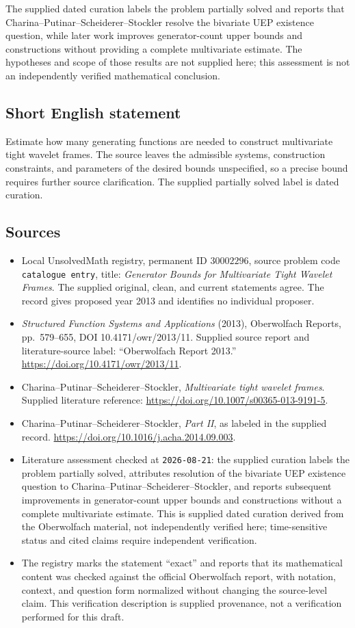 \documentclass[11pt]{article}
\begin{document}
The supplied dated curation labels the problem partially solved and reports that Charina--Putinar--Scheiderer--Stockler resolve the bivariate UEP existence question, while later work improves generator-count upper bounds and constructions without providing a complete multivariate estimate. The hypotheses and scope of those results are not supplied here; this assessment is not an independently verified mathematical conclusion.
\subsection{Short English statement}
Estimate how many generating functions are needed to construct multivariate tight wavelet frames. The source leaves the admissible systems, construction constraints, and parameters of the desired bounds unspecified, so a precise bound requires further source clarification. The supplied partially solved label is dated curation.
\subsection{Sources}
\begin{itemize}
\item Local UnsolvedMath registry, permanent ID \(30002296\), source problem code \texttt{catalogue entry}, title: \emph{Generator Bounds for Multivariate Tight Wavelet Frames}. The supplied original, clean, and current statements agree. The record gives proposed year 2013 and identifies no individual proposer.
\item \emph{Structured Function Systems and Applications} (2013), Oberwolfach Reports, pp.\ 579--655, DOI 10.4171/owr/2013/11. Supplied source report and literature-source label: ``Oberwolfach Report 2013.'' \url{https://doi.org/10.4171/owr/2013/11}.
\item Charina--Putinar--Scheiderer--Stockler, \emph{Multivariate tight wavelet frames}. Supplied literature reference: \url{https://doi.org/10.1007/s00365-013-9191-5}.
\item Charina--Putinar--Scheiderer--Stockler, \emph{Part II}, as labeled in the supplied record. \url{https://doi.org/10.1016/j.acha.2014.09.003}.
\item Literature assessment checked at \texttt{2026-08-21}: the supplied curation labels the problem partially solved, attributes resolution of the bivariate UEP existence question to Charina--Putinar--Scheiderer--Stockler, and reports subsequent improvements in generator-count upper bounds and constructions without a complete multivariate estimate. This is supplied dated curation derived from the Oberwolfach material, not independently verified here; time-sensitive status and cited claims require independent verification.
\item The registry marks the statement ``exact'' and reports that its mathematical content was checked against the official Oberwolfach report, with notation, context, and question form normalized without changing the source-level claim. This verification description is supplied provenance, not a verification performed for this draft.
\end{itemize}
\end{document}
